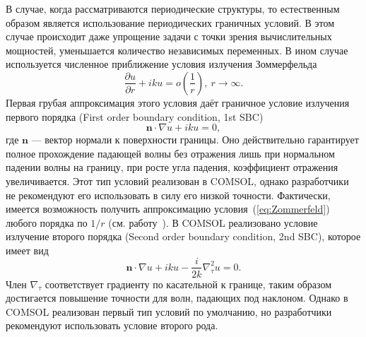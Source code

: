 В случае, когда рассматриваются периодические структуры, то естественным образом является использование периодических граничных условий. В этом случае происходит даже упрощение задачи с точки зрения вычислительных мощностей, уменьшается количество независимых переменных. В ином случае используется численное приближение условия излучения Зоммерфельда~\cite{bayliss1982boundary}
\begin{equation}
    \frac{\partial u}{\partial r}+i k u = o(\frac{1}{r}), \ r\to \infty.
    \label{eq:Zommerfeld}
\end{equation}
Первая грубая аппроксимация этого условия даёт граничное условие излучения первого порядка (First order boundary condition, 1st SBC)
\begin{equation}
    \textbf{n}\cdot \nabla u+i k u = 0,
    \label{eq:SBC_1}
\end{equation}
где $\mathbf{n}$ --- вектор нормали к поверхности границы.
Оно действительно гарантирует полное прохождение падающей волны без отражения лишь при нормальном падении волны на границу, при росте угла падения, коэффициент отражения увеличивается. Этот тип условий реализован в COMSOL, однако разработчики не рекомендуют его использовать в силу его низкой точности. Фактически, имеется возможность получить аппроксимацию условия~(\ref{eq:Zommerfeld}) любого порядка по $1/r$ (см. работу~\cite{bayliss1982boundary}). В COMSOL реализовано условие излучение второго порядка (Second order boundary condition, 2nd SBC), которое имеет вид
\begin{equation}
    \textbf{n}\cdot \nabla u+i k u - \frac{i}{2 k} \nabla^2_\tau u= 0.
    \label{eq:SBC_2}
\end{equation}
Член $\nabla_\tau$ соответствует градиенту по касательной к границе, таким образом достигается повышение точности для волн, падающих под наклоном. Однако в COMSOL реализован первый тип условий по умолчанию, но разработчики рекомендуют использовать условие второго рода.


